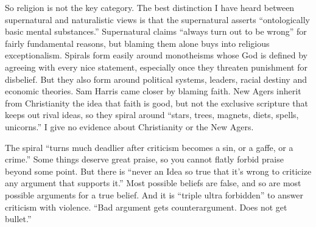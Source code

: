 So religion is not the key category. The best distinction I have heard between supernatural and naturalistic views is that the supernatural asserts ``ontologically basic mental substances.''  Supernatural claims ``always turn out to be wrong'' for fairly fundamental reasons, but blaming them alone buys into religious exceptionalism. Spirals form easily around monotheisms whose God is defined by agreeing with every nice statement, especially once they threaten punishment for disbelief. But they also form around political systems, leaders, racial destiny and economic theories. Sam Harris came closer by blaming faith. New Agers inherit from Christianity the idea that faith is good, but not the exclusive scripture that keeps out rival ideas, so they spiral around ``stars, trees, magnets, diets, spells, unicorns.'' I give no evidence about Christianity or the New Agers.

The spiral ``turns much deadlier after criticism becomes a sin, or a gaffe, or a crime.''  Some things deserve great praise, so you cannot flatly forbid praise beyond some point. But there is ``never an Idea so true that it's wrong to criticize any argument that supports it.'' Most possible beliefs are false, and so are most possible arguments for a true belief. And it is ``triple ultra forbidden'' to answer criticism with violence. ``Bad argument gets counterargument. Does not get bullet.''
